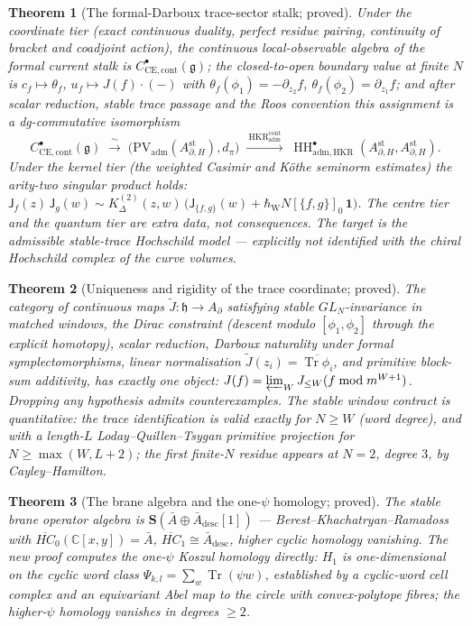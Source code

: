 \documentclass[11pt]{article}
\providecommand{\bC}{\mathbb{C}}
\providecommand{\fg}{\mathfrak{g}}
\providecommand{\fh}{\mathfrak{h}}
\providecommand{\fm}{\mathfrak{m}}
\providecommand{\Tr}{\operatorname{Tr}}
\providecommand{\HH}{\operatorname{HH}}
\providecommand{\CE}{\mathrm{CE}}
\providecommand{\PV}{\mathrm{PV}}
\providecommand{\hbW}{\hbar_{\mathrm{W}}}
\newtheorem{theorem}{Theorem}[section]
\begin{document}
\begin{theorem}[The formal-Darboux trace-sector stalk; proved]
\label{thm:stalk}
Under the coordinate tier \textup{(exact continuous duality, perfect
residue pairing, continuity of bracket and coadjoint action)}, the
continuous local-observable algebra of the formal current stalk is
$C^\bullet_{\CE,\mathrm{cont}}(\fg)$; the closed-to-open boundary
value at finite $N$ is
$c_f\mapsto\theta_f$, $u_f\mapsto J(f)\cdot(-)$ with
$\theta_f(\phi_1)=-\partial_{z_2}f$,
$\theta_f(\phi_2)=\partial_{z_1}f$; and after scalar reduction,
stable trace passage and the Roos convention this assignment is a
dg-commutative isomorphism
\[
C^\bullet_{\CE,\mathrm{cont}}(\fg)
\;\xrightarrow{\ \sim\ }\;
\bigl(\PV_{\mathrm{adm}}(A^{\mathrm{st}}_{\partial,H}),d_\pi\bigr)
\;\xrightarrow{\ \mathrm{HKR}^{\mathrm{cont}}_{\mathrm{adm}}\ }\;
\HH^\bullet_{\mathrm{adm,HKR}}
(A^{\mathrm{st}}_{\partial,H},A^{\mathrm{st}}_{\partial,H}).
\]
Under the kernel tier \textup{(the weighted Casimir and K\"othe
seminorm estimates)} the arity-two singular product holds:
$\mathsf J_f(z)\,\mathsf J_g(w)\sim
K^{(2)}_\Delta(z,w)\,\bigl(\mathsf J_{\{f,g\}}(w)
+\hbW N[\{f,g\}]_0\,\mathbf 1\bigr)$. The centre tier and the quantum
tier are extra data, not consequences. The target is the admissible
stable-trace Hochschild model --- explicitly \emph{not} identified
with the chiral Hochschild complex of the curve volumes.
\end{theorem}

\begin{theorem}[Uniqueness and rigidity of the trace coordinate;
proved]\label{thm:unique}
The category of continuous maps $\widetilde J\colon\fh\to A_\partial$
satisfying stable $GL_N$-invariance in matched windows, the Dirac
constraint \textup{(descent modulo $[\phi_1,\phi_2]$ through the
explicit homotopy)}, scalar reduction, Darboux naturality under formal
symplectomorphisms, linear normalisation
$\widetilde J(z_i)=\overline{\Tr\phi_i}$, and primitive block-sum
additivity, has exactly one object:
$J(f)=\varprojlim_W J_{\le W}(f\bmod\fm^{W+1})$. Dropping any
hypothesis admits counterexamples. The stable window contract is
quantitative: the trace identification is valid exactly for
$N\ge W$ \textup{(word degree)}, and with a length-$L$
Loday--Quillen--Tsygan primitive projection for
$N\ge\max(W,L+2)$; the first finite-$N$ residue appears at
$N=2$, degree $3$, by Cayley--Hamilton.
\end{theorem}

\begin{theorem}[The brane algebra and the one-$\psi$ homology; proved]
\label{thm:brane}
The stable brane operator algebra is
$\mathbf S(\bar A\oplus\bar A_{\mathrm{desc}}[1])$ ---
Berest--Khachatryan--Ramadoss with
$\overline{HC}_0(\bC[x,y])=\bar A$,
$\overline{HC}_1\cong\bar A_{\mathrm{desc}}$, higher cyclic homology
vanishing. The new proof computes the one-$\psi$ Koszul homology
directly: $H_1$ is one-dimensional on the cyclic word class
$\Psi_{k,l}=\sum_{w}\Tr(\psi w)$, established by a cyclic-word cell
complex and an equivariant Abel map to the circle with
convex-polytope fibres; the higher-$\psi$ homology vanishes in
degrees $\ge2$.
\end{theorem}
\end{document}
